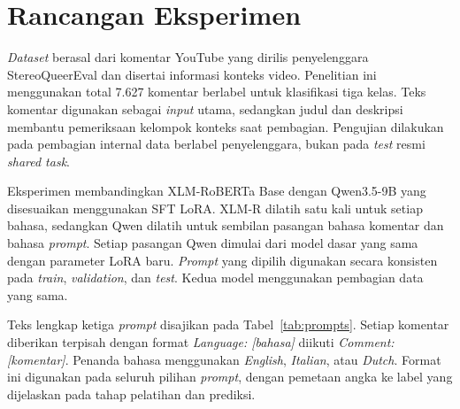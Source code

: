 \documentclass[11pt]{article}
\begin{document}
\section{Rancangan Eksperimen}
\textit{Dataset} berasal dari komentar YouTube yang dirilis penyelenggara StereoQueerEval dan disertai informasi konteks video. Penelitian ini menggunakan total 7.627 komentar berlabel untuk klasifikasi tiga kelas. Teks komentar digunakan sebagai \textit{input} utama, sedangkan judul dan deskripsi membantu pemeriksaan kelompok konteks saat pembagian. Pengujian dilakukan pada pembagian internal data berlabel penyelenggara, bukan pada \textit{test} resmi \textit{shared task}.

Eksperimen membandingkan XLM-RoBERTa Base dengan Qwen3.5-9B yang disesuaikan menggunakan SFT LoRA. XLM-R dilatih satu kali untuk setiap bahasa, sedangkan Qwen dilatih untuk sembilan pasangan bahasa komentar dan bahasa \textit{prompt}. Setiap pasangan Qwen dimulai dari model dasar yang sama dengan parameter LoRA baru. \textit{Prompt} yang dipilih digunakan secara konsisten pada \textit{train}, \textit{validation}, dan \textit{test}. Kedua model menggunakan pembagian data yang sama.

Teks lengkap ketiga \textit{prompt} disajikan pada Tabel~\ref{tab:prompts}. Setiap komentar diberikan terpisah dengan format \textit{Language: [bahasa]} diikuti \textit{Comment: [komentar]}. Penanda bahasa menggunakan \textit{English}, \textit{Italian}, atau \textit{Dutch}. Format ini digunakan pada seluruh pilihan \textit{prompt}, dengan pemetaan angka ke label yang dijelaskan pada tahap pelatihan dan prediksi.
\end{document}
